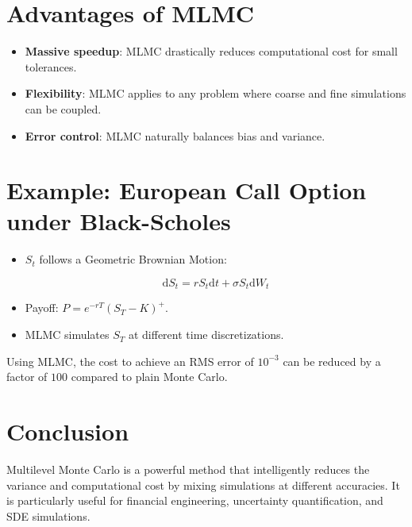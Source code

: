\documentclass{article}
\begin{document}
\section{Advantages of MLMC}
\begin{itemize}
  \item \textbf{Massive speedup}: MLMC drastically reduces computational cost for small tolerances.
  \item \textbf{Flexibility}: MLMC applies to any problem where coarse and fine simulations can be coupled.
  \item \textbf{Error control}: MLMC naturally balances bias and variance.
\end{itemize}

\section{Example: European Call Option under Black-Scholes}
\begin{itemize}
  \item $S_t$ follows a Geometric Brownian Motion:

\begin{equation}
\mathrm{d}S_t = r S_t \mathrm{d}t + \sigma S_t \mathrm{d}W_t
\end{equation}

  \item Payoff: $P = e^{-rT} (S_T - K)^+$.
  \item MLMC simulates $S_T$ at different time discretizations.
\end{itemize}

Using MLMC, the cost to achieve an RMS error of $10^{-3}$ can be reduced by a factor of $100$ compared to plain Monte Carlo.

\section{Conclusion}
Multilevel Monte Carlo is a powerful method that intelligently reduces the variance and computational cost by mixing simulations at different accuracies.\newline
It is particularly useful for financial engineering, uncertainty quantification, and SDE simulations.
\end{document}
